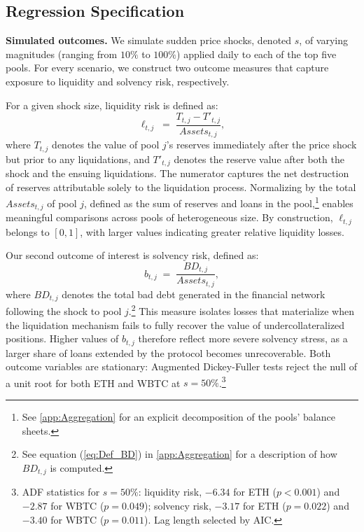\documentclass[a4paper,UKenglish,cleveref, autoref, thm-restate]{informs3}
\newcommand{\boldpara}[1]{\noindent\textbf{#1}\quad}
\begin{document}
\subsection{Regression Specification}
\label{sec:Regression_Specification}
\medskip

\boldpara{Simulated outcomes.} We simulate sudden price shocks, denoted $s$, of varying magnitudes (ranging from $10\%$ to $100\%$) applied daily to each of the top five pools. For every scenario, we construct two outcome measures that capture exposure to liquidity and solvency risk, respectively.

For a given shock size, liquidity risk is defined as:
\begin{equation}
    \ell_{t,j}
    \;=\;
    \frac{T_{t,j} - T'_{t,j}}{\textit{Assets}_{t,j}},
    \label{eq:outcome}
\end{equation}
where $T_{t,j}$ denotes the value of pool $j$'s reserves immediately after the price shock but prior to any liquidations, and $T'_{t,j}$ denotes the reserve value after both the shock and the ensuing liquidations. The numerator captures the net destruction of reserves attributable solely to the liquidation process. Normalizing by the total \(\textit{Assets}_{t,j}\) of pool \(j\), defined as the sum of reserves and loans in the pool,\footnote{See \ref{app:Aggregation} for an explicit decomposition of the pools' balance sheets.} enables meaningful comparisons across pools of heterogeneous size. By construction, $\ell_{t,j}$ belongs to $[0,1]$, with larger values indicating greater relative liquidity losses. 

Our second outcome of interest is solvency risk, defined as:
\begin{equation}
    b_{t,j}
    \;=\;
    \frac{BD_{t,j}}{\textit{Assets}_{t,j}},
    \label{eq:bad_debt}
\end{equation}
where $BD_{t,j}$ denotes the total bad debt generated in the financial network following the shock to pool $j$.\footnote{See equation (\ref{eq:Def_BD}) in \ref{app:Aggregation} for a description of how $BD_{t,j}$ is computed.} This measure isolates losses that materialize when the liquidation mechanism fails to fully recover the value of undercollateralized positions. Higher values of $b_{t,j}$ therefore reflect more severe solvency stress, as a larger share of loans extended by the protocol becomes unrecoverable. Both outcome variables are stationary: Augmented Dickey-Fuller tests reject the null of a unit root for both ETH and WBTC at $s = 50\%$.\footnote{ADF statistics for $s=50\%$: liquidity risk, $-6.34$ for ETH 
($p<0.001$) and $-2.87$ for WBTC ($p=0.049$); solvency risk, 
$-3.17$ for ETH ($p=0.022$) and $-3.40$ for WBTC ($p=0.011$). 
Lag length selected by AIC.}
\end{document}
